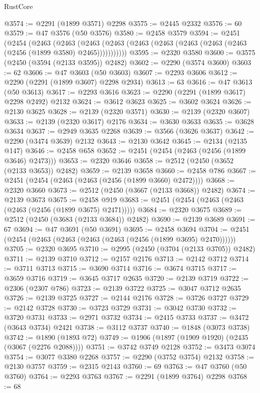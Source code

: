 \begin{lexlean}{RustCore}
\begin{coremodule}
@3574 := @2291 (@1899 @3571) @2298
@3575 := @2445 @2332
@3576 := 60
@3579 := @47 @3576 (@50 @3576)
@3580 := @2458 @3579
@3594 := @2451
    (@2454
      (@2463
        (@2463
          (@2463 (@2463 (@2463 (@2463 (@2463 (@2463 (@2463 (@2456 (@1899 @3580) @2465)))))))))))
@3595 := @2320 @3580
@3600 := @3575 (@2450 (@3594 (@2133 @3595)) @2482)
@3602 := @2290 (@3574 @3600)
@3603 := 62
@3606 := @47 @3603 (@50 @3603)
@3607 := @2293 @3606
@3612 := @2290 (@2291 (@1899 @3607) @2298 @2934)
@3613 := 63
@3616 := @47 @3613 (@50 @3613)
@3617 := @2293 @3616
@3623 := @2290 (@2291 (@1899 @3617) @2298 @2492) @2132
@3624 := @3612 @3623
@3625 := @3602 @3624
@3626 := @2130 @3625
@3628 := @2139 (@2320 @3571)
@3630 := @2139 (@2320 @3607)
@3633 := @2139 (@2320 @3617) @2176
@3634 := @3630 @3633
@3635 := @3628 @3634
@3637 := @2949 @3635 @2268
@3639 := @3566 (@3626 @3637)
@3642 := @2290 (@3474 @3639) @2132
@3643 := @2130 @3642
@3645 := @2134 (@2135 @147)
@3646 := @2458 @658
@3652 := @2451 (@2454 (@2463 (@2456 (@1899 @3646) @2473)))
@3653 := @2320 @3646
@3658 := @2512 (@2450 (@3652 (@2133 @3653)) @2482)
@3659 := @2139 @3658
@3660 := @2458 @786
@3667 := @2451 (@2454 (@2463 (@2463 (@2456 (@1899 @3660) @2472))))
@3668 := @2320 @3660
@3673 := @2512 (@2450 (@3667 (@2133 @3668)) @2482)
@3674 := @2139 @3673
@3675 := @2458 @919
@3683 := @2451 (@2454 (@2463 (@2463 (@2463 (@2456 (@1899 @3675) @2471)))))
@3684 := @2320 @3675
@3689 := @2512 (@2450 (@3683 (@2133 @3684)) @2482)
@3690 := @2139 @3689
@3691 := 67
@3694 := @47 @3691 (@50 @3691)
@3695 := @2458 @3694
@3704 := @2451 (@2454 (@2463 (@2463 (@2463 (@2463 (@2456 (@1899 @3695) @2470))))))
@3705 := @2320 @3695
@3710 := @2995 (@2450 (@3704 (@2133 @3705)) @2482)
@3711 := @2139 @3710
@3712 := @2157 @2176
@3713 := @2142 @3712
@3714 := @3711 @3713
@3715 := @3690 @3714
@3716 := @3674 @3715
@3717 := @3659 @3716
@3719 := @3645 @3717 @2635
@3720 := @2139 @3719
@3722 := @2306 (@2307 @786)
@3723 := @2139 @3722
@3725 := @3047 @3712 @2635
@3726 := @2139 @3725
@3727 := @2144 @2176
@3728 := @3726 @3727
@3729 := @2142 @3728
@3730 := @3723 @3729
@3731 := @3042 @3730
@3732 := @3720 @3731
@3733 := @2971 @3732
@3734 := @2415 @3733
@3737 := @3472 (@3643 @3734) @2421
@3738 := @3112 @3737
@3740 := @1848 (@3073 @3738)
@3742 := @1890 (@1893 @72)
@3749 := @1906 (@1897 (@1909 @1920) (@2435 (@3067 (@2276 @2088))))
@3751 := @3742 @3749 @2128
@3752 := @3473 @3074
@3754 := @3077 @3380 @2268
@3757 := @2290 (@3752 @3754) @2132
@3758 := @2130 @3757
@3759 := @2315 @2143
@3760 := 69
@3763 := @47 @3760 (@50 @3760)
@3764 := @2293 @3763
@3767 := @2291 (@1899 @3764) @2298
@3768 := 68

\end{coremodule}
\end{lexlean}
